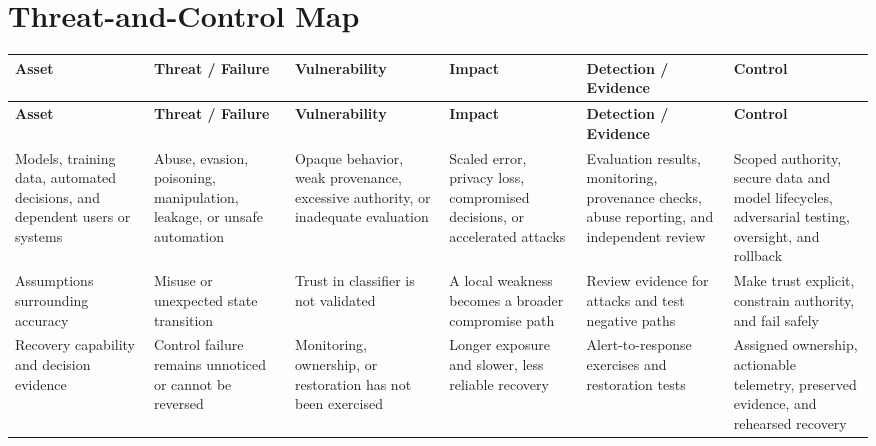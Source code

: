 \documentclass[11pt]{article}
\begin{document}
\section*{Threat-and-Control Map}
\begingroup\scriptsize\setlength{\tabcolsep}{2pt}
\begin{longtable}{>{\RaggedRight\arraybackslash}p{}>{\RaggedRight\arraybackslash}p{}>{\RaggedRight\arraybackslash}p{}>{\RaggedRight\arraybackslash}p{}>{\RaggedRight\arraybackslash}p{}>{\RaggedRight\arraybackslash}p{}}
\toprule\rowcolor{Navy}\color{white}\textbf{Asset} & \color{white}\textbf{Threat / Failure} & \color{white}\textbf{Vulnerability} & \color{white}\textbf{Impact} & \color{white}\textbf{Detection / Evidence} & \color{white}\textbf{Control}\\\midrule
\endfirsthead
\toprule\rowcolor{Navy}\color{white}\textbf{Asset} & \color{white}\textbf{Threat / Failure} & \color{white}\textbf{Vulnerability} & \color{white}\textbf{Impact} & \color{white}\textbf{Detection / Evidence} & \color{white}\textbf{Control}\\\midrule
\endhead
Models, training data, automated decisions, and dependent users or systems & Abuse, evasion, poisoning, manipulation, leakage, or unsafe automation & Opaque behavior, weak provenance, excessive authority, or inadequate evaluation & Scaled error, privacy loss, compromised decisions, or accelerated attacks & Evaluation results, monitoring, provenance checks, abuse reporting, and independent review & Scoped authority, secure data and model lifecycles, adversarial testing, oversight, and rollback\\\midrule
Assumptions surrounding accuracy & Misuse or unexpected state transition & Trust in classifier is not validated & A local weakness becomes a broader compromise path & Review evidence for attacks and test negative paths & Make trust explicit, constrain authority, and fail safely\\\midrule
Recovery capability and decision evidence & Control failure remains unnoticed or cannot be reversed & Monitoring, ownership, or restoration has not been exercised & Longer exposure and slower, less reliable recovery & Alert-to-response exercises and restoration tests & Assigned ownership, actionable telemetry, preserved evidence, and rehearsed recovery\\\midrule
\bottomrule
\end{longtable}
\endgroup
\end{document}
